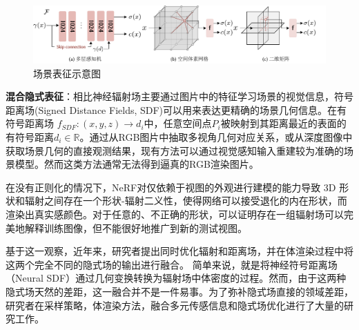 \begin{figure}[t]
    \centering
    \includegraphics[width=\textwidth]{undergraduate-thesis/images/Scene Representations.pdf}
    \caption{场景表征示意图}
    \label{fig:scene-representation}
\end{figure}

\textbf{混合隐式表征}：相比神经辐射场主要通过图片中的特征学习场景的视觉信息，符号距离场(Signed Distance Fields, SDF)可以用来表达更精确的场景几何信息。在有符号距离场 $f_{SDF}:(x,y,z)\to d_i$中，任意空间点$P_i$被映射到其距离最近的表面的有符号距离$d_i\in \mathbb{R}$。通过从RGB图片中抽取多视角几何对应关系，或从深度图像中获取场景几何的直接观测结果，现有方法可以通过视觉感知输入重建较为准确的场景模型。然而这类方法通常无法得到逼真的RGB渲染图片。

在没有正则化的情况下，NeRF\cite{mildenhall_nerf_2020}对仅依赖于视图的外观进行建模的能力导致 3D 形状和辐射之间存在一个形状-辐射二义性，使得网络可以接受退化的内在形状，而渲染出真实感颜色。对于任意的、不正确的形状，可以证明存在一组辐射场可以完美地解释训练图像，但不能很好地推广到新的测试视图。

基于这一观察，近年来，研究者提出同时优化辐射和距离场，并在体渲染过程中将这两个完全不同的隐式场的输出进行融合\cite{oechsle_unisurf_2021,gropp_implicit_2020,yariv_multiview_2020,yariv_volume_2021,wang_neus_2021,shao_doublefield_2022,darmon_improving_2022,ueda_neural_2022,long_sparseneus_2022,yu_monosdf_2022,wang_pet-neus_2023,yuan_monocular_2023,liang_hr-neus_2023,chen_dehazenerf_2023,zhu_vdn-nerf_2023,azinovic_neural_2022, sun_neural_2022}。 简单来说，就是将神经符号距离场（Neural SDF）通过几何变换转换为辐射场中体密度的过程。然而，由于这两种隐式场天然的差距，这一融合并不是一件易事。为了弥补隐式场直接的领域差距，研究者在采样策略\cite{yariv_volume_2021, mildenhall_nerf_2020, barron_mip-nerf_2022, oechsle_unisurf_2021}，体渲染方法\cite{oechsle_unisurf_2021,yariv_volume_2021,wang_neus_2021}，融合多元传感信息\cite{azinovic_neural_2022,yu_monosdf_2022}和隐式场优化进行了大量的研究工作\cite{yu_sdfstudio_2022}。

